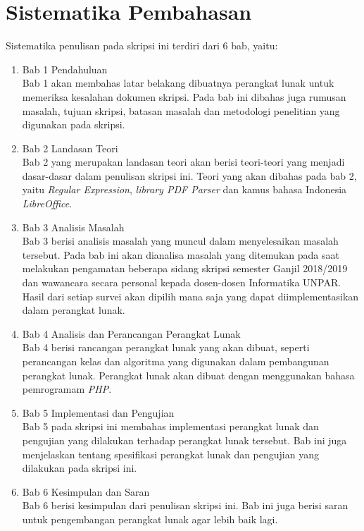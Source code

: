 \section{Sistematika Pembahasan}
\label{sec:sispem}
Sistematika penulisan pada skripsi ini terdiri dari 6 bab, yaitu:

\begin{enumerate}
	\item Bab 1 Pendahuluan
	\\
	Bab 1 akan membahas latar belakang dibuatnya perangkat lunak untuk memeriksa kesalahan dokumen skripsi. Pada bab ini dibahas juga rumusan masalah, tujuan skripsi, batasan masalah dan metodologi penelitian yang digunakan pada skripsi.

	\item Bab 2 Landasan Teori
	\\
	Bab 2 yang merupakan landasan teori akan berisi teori-teori yang menjadi dasar-dasar dalam penulisan skripsi ini. Teori yang akan dibahas pada bab 2, yaitu \textit{Regular Expression}, \textit{library PDF Parser} dan kamus bahasa Indonesia \textit{LibreOffice}.
	
	\item Bab 3 Analisis Masalah
	\\
	Bab 3 berisi analisis masalah yang muncul dalam menyelesaikan masalah tersebut. Pada bab ini akan dianalisa masalah yang ditemukan pada saat melakukan pengamatan beberapa sidang skripsi semester Ganjil 2018/2019 dan wawancara secara personal kepada dosen-dosen Informatika UNPAR. Hasil dari setiap survei akan dipilih mana saja yang dapat diimplementasikan dalam perangkat lunak.
	
	\item Bab 4 Analisis dan Perancangan Perangkat Lunak
	\\
	Bab 4 berisi rancangan perangkat lunak yang akan dibuat, seperti perancangan kelas dan algoritma yang digunakan dalam pembangunan perangkat lunak. Perangkat lunak akan dibuat dengan menggunakan bahasa pemrogramam \textit{PHP}.
	
	\item Bab 5 Implementasi dan Pengujian
	\\
	Bab 5 pada skripsi ini membahas implementasi perangkat lunak dan pengujian yang dilakukan terhadap perangkat lunak tersebut. Bab ini juga menjelaskan tentang spesifikasi perangkat lunak dan pengujian yang dilakukan pada skripsi ini.
	
	\item Bab 6 Kesimpulan dan Saran
	\\
	Bab 6 berisi kesimpulan dari penulisan skripsi ini. Bab ini juga berisi saran untuk pengembangan perangkat lunak agar lebih baik lagi.
\end{enumerate}